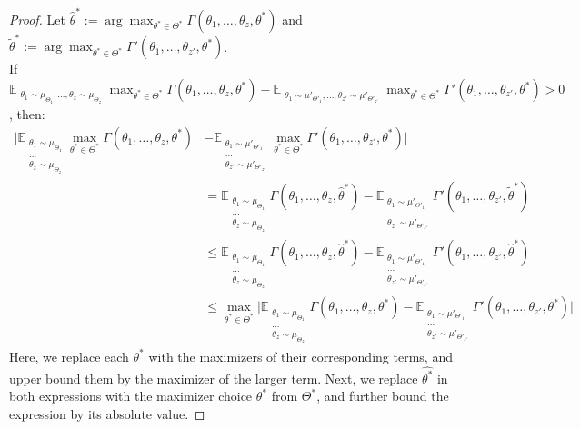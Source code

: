 \documentclass{article}
\theoremstyle{plain}
\theoremstyle{definition}
\def\E{\mathbb{E}}
\begin{document}
\begin{proof}
Let $\hat{\theta}^* := \arg\max_{\theta^*\in\Theta^*}\Gamma(\theta_1,\dots,\theta_z,\theta^*)$ and $\tilde{\theta}^*:=\arg\max_{\theta^*\in\Theta^*}\Gamma'(\theta_1,\dots,\theta_{z'},\theta^*)$.\\

If $\E_{\substack{\theta_1\sim \mu_{\Theta_1}, \dots, \theta_z\sim\mu_{\Theta_z}}} \max_{\theta^*\in\Theta^*} \Gamma(\theta_1,\dots,\theta_z,\theta^*) - \E_{\substack{\theta_1\sim \mu'_{\Theta'_1}, \dots, \theta_{z'}\sim\mu'_{\Theta'_{z'}}}}\max_{{\theta}^{*}\in\Theta^*} \Gamma'(\theta_1,\dots,\theta_{z'},\theta^*) > 0$, then:
\begin{align*}
\bigg|\E_{\substack{\theta_1\sim \mu_{\Theta_1} \\ \dots \\ \theta_z\sim\mu_{\Theta_z}}} \max_{\theta^*\in\Theta^*} \Gamma(\theta_1,\dots,\theta_z,\theta^*) &- \E_{\substack{\theta_1\sim \mu'_{\Theta'_1}\\ \dots\\ \theta_{z'}\sim\mu'_{\Theta'_{z'}}}}\max_{{\theta}^{*}\in\Theta^*} \Gamma'(\theta_1,\dots,\theta_{z'},\theta^*)\bigg| \\
&= \E_{\substack{\theta_1\sim \mu_{\Theta_1} \\ \dots \\ \theta_z\sim\mu_{\Theta_z}}} \Gamma(\theta_1,\dots,\theta_z,\hat{\theta}^*) - \E_{\substack{\theta_1\sim \mu'_{\Theta'_1}\\ \dots\\ \theta_{z'}\sim\mu'_{\Theta'_{z'}}}} \Gamma'(\theta_1,\dots,\theta_{z'},\tilde{\theta}^*) \\
    &\leq \E_{\substack{\theta_1\sim \mu_{\Theta_1} \\ \dots \\ \theta_z\sim\mu_{\Theta_z}}} \Gamma(\theta_1,\dots,\theta_z,\hat{\theta}^*) - \E_{\substack{\theta_1\sim \mu'_{\Theta'_1}\\ \dots\\ \theta_{z'}\sim\mu'_{\Theta'_{z'}}}} \Gamma'(\theta_1,\dots,\theta_{z'},\hat{\theta}^*) \\
    &\leq \max_{\theta^*\in\Theta^*}\bigg|\E_{\substack{\theta_1\sim \mu_{\Theta_1} \\ \dots \\ \theta_z\sim\mu_{\Theta_z}}} \Gamma(\theta_1,\dots,\theta_z,{\theta}^*) - \E_{\substack{\theta_1\sim \mu'_{\Theta'_1}\\ \dots\\ \theta_{z'}\sim\mu'_{\Theta'_{z'}}}} \Gamma'(\theta_1,\dots,\theta_{z'},{\theta}^*)\bigg|
\end{align*}
Here, we replace each $\theta^*$ with the maximizers of their corresponding terms, and upper bound them by the maximizer of the larger term.  Next, we replace $\hat{\theta^*}$ in both expressions with the maximizer choice $\theta^*$ from $\Theta^*$, and further bound the expression by its absolute value.


\end{proof}
\end{document}
